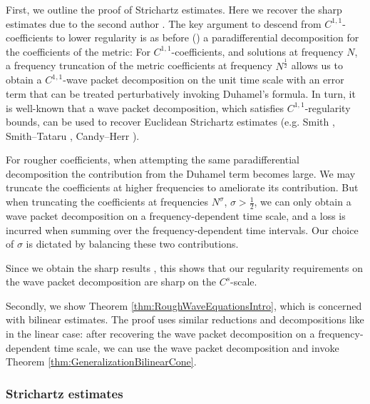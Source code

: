 \documentclass{amsart}
\theoremstyle{definition}
\begin{document}
First, we outline the proof of Strichartz estimates. Here we recover the sharp estimates due to the second author \cite{Tataru2001}. The key argument to descend from $C^{1,1}$-coefficients to lower regularity is as before (\cite{BahouriChemin1999,Tataru2001,Tataru2002}) a paradifferential decomposition for the coefficients of the metric: For $C^{1,1}$-coefficients, and solutions at frequency $N$, a frequency truncation of the metric coefficients at frequency $N^\frac12$
 allows us to obtain a $C^{1,1}$-wave packet decomposition on the unit time scale with an error term that can be treated perturbatively invoking Duhamel's formula. In turn, it is well-known that a wave packet decomposition, which satisfies $C^{1,1}$-regularity bounds, can be used to recover Euclidean Strichartz estimates (e.g. Smith \cite{Smith1998}, Smith--Tataru \cite{SmithTataru2005}, Candy--Herr \cite{CandyHerr2018}).

\smallskip

For rougher coefficients, when attempting the same paradifferential decomposition the contribution from the Duhamel term becomes large. 
We may truncate the coefficients at higher frequencies to ameliorate its contribution.
But when truncating the coefficients at frequencies $N^{\sigma}$, $\sigma > \frac{1}{2}$, we can only obtain a wave packet decomposition on a frequency-dependent time scale, and a loss is incurred when summing over the frequency-dependent time intervals. Our choice of $\sigma$ is dictated by balancing these two contributions.

Since we obtain the sharp results \cite{Tataru2001,SmithTataru2002}, this shows that our regularity requirements on the wave packet decomposition are sharp on the $C^{s}$-scale.

Secondly, we show Theorem \ref{thm:RoughWaveEquationsIntro}, which is concerned with bilinear estimates. The proof uses similar reductions and decompositions like in the linear case: after recovering the wave packet decomposition on a frequency-dependent time scale, we can use the wave packet decomposition and invoke Theorem \ref{thm:GeneralizationBilinearCone}.

\subsubsection{Strichartz estimates}
\end{document}
